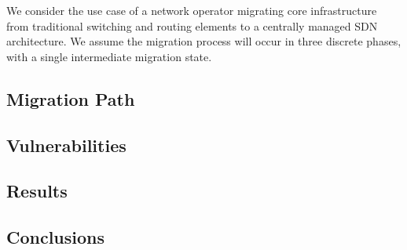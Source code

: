We consider the use case of a network operator migrating core infrastructure from traditional switching and routing elements to a centrally managed SDN architecture. We assume the migration process will occur in three discrete phases, with a single intermediate migration state. 


% 

\subsection{Migration Path}



\subsection{Vulnerabilities}



\subsection{Results}



\subsection{Conclusions}



% 

% 

% 